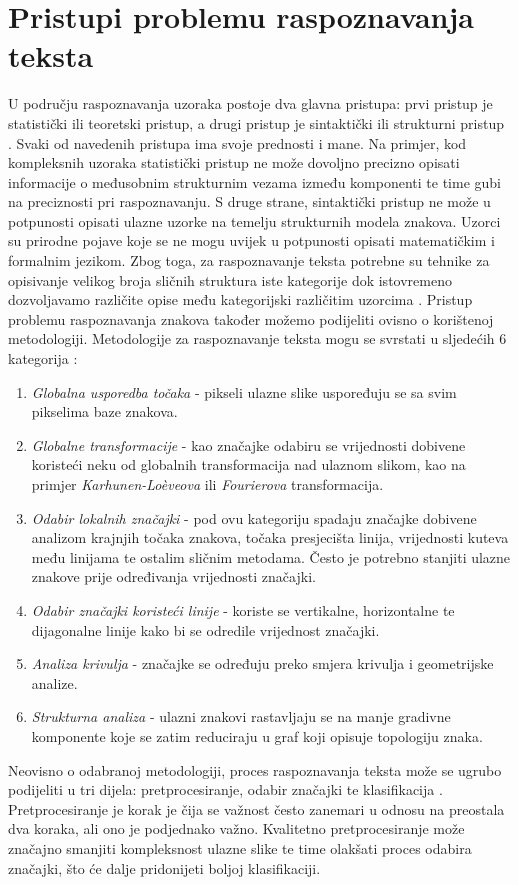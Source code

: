 \section{Pristupi problemu raspoznavanja teksta}
\label{sec:pristupi-problemu-raspoznavanja-teksta}
U području raspoznavanja uzoraka postoje dva glavna pristupa: prvi pristup je statistički ili teoretski pristup, a drugi
pristup je sintaktički ili strukturni pristup \citep{govindan1989}. Svaki od navedenih pristupa ima svoje prednosti i
mane. Na primjer, kod kompleksnih uzoraka statistički pristup ne može dovoljno precizno opisati informacije o međusobnim
strukturnim vezama između komponenti te time gubi na preciznosti pri raspoznavanju. S druge strane, sintaktički pristup
ne može u potpunosti opisati ulazne uzorke na temelju strukturnih modela znakova. Uzorci su prirodne pojave koje se ne
mogu uvijek u potpunosti opisati matematičkim i formalnim jezikom. Zbog toga, za raspoznavanje teksta potrebne su
tehnike za opisivanje velikog broja sličnih struktura iste kategorije dok istovremeno dozvoljavamo različite opise
među kategorijski različitim uzorcima \citep{govindan1989}. Pristup problemu raspoznavanja znakova također možemo
podijeliti ovisno o korištenoj metodologiji. Metodologije za raspoznavanje teksta mogu se svrstati u sljedećih 6
kategorija \citep{mantas1986}:
\begin{enumerate}
    \item \emph{Globalna usporedba točaka} - pikseli ulazne slike uspoređuju se sa svim pikselima baze znakova.
    \item \emph{Globalne transformacije} - kao značajke odabiru se vrijednosti dobivene koristeći neku od globalnih
    transformacija nad ulaznom slikom, kao na primjer \emph{Karhunen-Loèveova} ili \emph{Fourierova} transformacija.
    \item \emph{Odabir lokalnih značajki} - pod ovu kategoriju spadaju značajke dobivene analizom krajnjih točaka
    znakova, točaka presjecišta linija, vrijednosti kuteva među linijama te ostalim sličnim metodama. Često je potrebno
    stanjiti ulazne znakove prije određivanja vrijednosti značajki.
    \item \emph{Odabir značajki koristeći linije} - koriste se vertikalne, horizontalne te dijagonalne linije kako bi
    se odredile vrijednost značajki.
    \item \emph{Analiza krivulja} - značajke se određuju preko smjera krivulja i geometrijske analize.
    \item \emph{Strukturna analiza} - ulazni znakovi rastavljaju se na manje gradivne komponente koje se zatim
    reduciraju u graf koji opisuje topologiju znaka.
\end{enumerate}
Neovisno o odabranoj metodologiji, proces raspoznavanja teksta može se ugrubo podijeliti u tri dijela: pretprocesiranje,
odabir značajki te klasifikacija \citep{mori1999}. Pretprocesiranje je korak je čija se važnost često zanemari u odnosu
na preostala dva koraka, ali ono je podjednako važno. Kvalitetno pretprocesiranje može značajno smanjiti kompleksnost
ulazne slike te time olakšati proces odabira značajki, što će dalje pridonijeti boljoj klasifikaciji.


